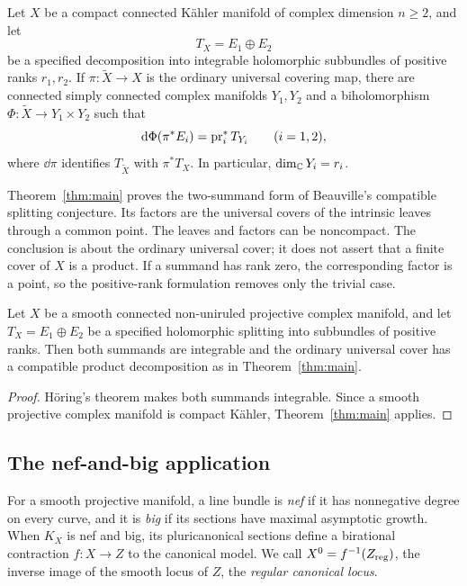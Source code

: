 \begin{theorem}\label{thm:main}
Let $X$ be a compact connected K\"ahler manifold of complex dimension
$n\geq2$, and let
\[
T_X=E_1\oplus E_2
\]
be a specified decomposition into integrable holomorphic subbundles of
positive ranks $r_1,r_2$. If $\pi:\widetilde X\to X$ is the ordinary
universal covering map, there are connected simply connected complex
manifolds $Y_1,Y_2$ and a biholomorphism
$\Phi:\widetilde X\to Y_1\times Y_2$ such that
\[
\mathrm d\Phi(\pi^*E_i)=\operatorname{pr}_i^*T_{Y_i}\qquad(i=1,2),
\]
where $\dd\pi$ identifies $T_{\widetilde X}$ with $\pi^*T_X$.
In particular, $\dim_\mathbb C Y_i=r_i$.
\end{theorem}

Theorem~\ref{thm:main} proves the two-summand form of Beauville's
compatible splitting conjecture. Its factors are the universal covers
of the intrinsic leaves through a common point. The leaves and factors
can be noncompact. The conclusion is about the ordinary universal cover;
it does not assert that a finite cover of $X$ is a product. If a summand
has rank zero, the corresponding factor is a point, so the positive-rank
formulation removes only the trivial case.

\begin{corollary}\label{cor:non-uniruled}
Let $X$ be a smooth connected non-uniruled projective complex manifold,
and let $T_X=E_1\oplus E_2$ be a specified holomorphic splitting into
subbundles of positive ranks. Then both summands are integrable and the
ordinary universal cover has a compatible product decomposition as in
Theorem~\ref{thm:main}.
\end{corollary}

\begin{proof}
H\"oring's theorem \cite[Theorem~1.3]{Horing07} makes both summands
integrable. Since a smooth projective complex manifold is compact
K\"ahler, Theorem~\ref{thm:main} applies.
\end{proof}

\subsection*{The nef-and-big application}

For a smooth projective manifold, a line bundle is \emph{nef} if it has
nonnegative degree on every curve, and it is \emph{big} if its sections
have maximal asymptotic growth. When $K_X$ is nef and big, its
pluricanonical sections define a birational contraction $f:X\to Z$ to
the canonical model. We call $X^0=f^{-1}(Z_{\mathrm{reg}})$, the inverse image
of the smooth locus of $Z$, the \emph{regular canonical locus}.

